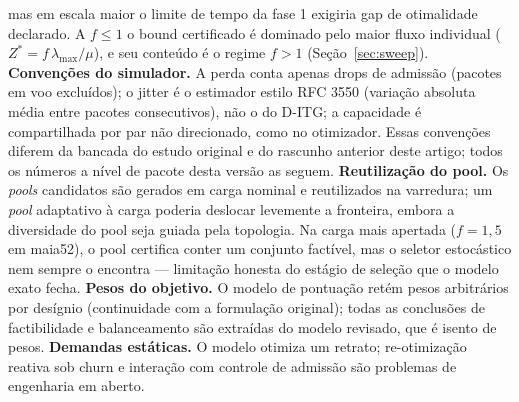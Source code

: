 \documentclass[journal]{IEEEtran}
\begin{document}
mas em escala maior o limite de tempo da fase 1 exigiria gap de otimalidade
declarado. A $f\le 1$ o bound certificado é dominado pelo maior fluxo
individual ($Z^{*}=f\,\lambda_{\max}/\mu$), e seu conteúdo é o regime
$f>1$ (Seção~\ref{sec:sweep}).
\textbf{Convenções do simulador.} A perda conta apenas drops de admissão
(pacotes em voo excluídos); o jitter é o estimador estilo RFC 3550
(variação absoluta média entre pacotes consecutivos), não o do D-ITG; a
capacidade é compartilhada por par não direcionado, como no otimizador.
Essas convenções diferem da bancada do estudo original e do rascunho
anterior deste artigo; todos os números a nível de pacote desta versão as
seguem.
\textbf{Reutilização do pool.} Os \emph{pools} candidatos são gerados em
carga nominal e reutilizados na varredura; um \emph{pool} adaptativo à carga
poderia deslocar levemente a fronteira, embora a diversidade do pool seja
guiada pela topologia. Na carga mais apertada ($f=1{,}5$ em maia52), o pool
certifica conter um conjunto factível, mas o seletor estocástico nem sempre
o encontra --- limitação honesta do estágio de seleção que o modelo exato
fecha.
\textbf{Pesos do objetivo.} O modelo de pontuação retém pesos arbitrários por
desígnio (continuidade com a formulação original); todas as conclusões de
factibilidade e balanceamento são extraídas do modelo revisado, que é isento
de pesos.
\textbf{Demandas estáticas.} O modelo otimiza um retrato; re-otimização
reativa sob churn e interação com controle de admissão são problemas de
engenharia em aberto.

\end{document}
